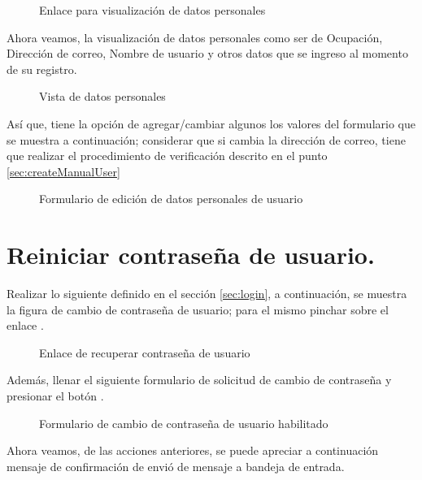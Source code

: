 \begin{figure}[!ht]
\centering
		\caption{Enlace para visualización de datos personales}
\end{figure}

Ahora veamos, la visualización de datos personales como ser de Ocupación,
Dirección de correo, Nombre de usuario y otros datos que se ingreso al momento
de su registro. 

\begin{figure}[H]
\centering
		\caption{Vista de datos personales}
\end{figure}

Así que, tiene la opción de agregar/cambiar algunos los valores del formulario
que se muestra a continuación; considerar que si cambia la dirección de correo,
tiene que realizar el procedimiento de verificación descrito en el punto 
\ref{sec:createManualUser}

\begin{figure}[H]
\centering
		\caption{Formulario de edición de datos personales de usuario}
\end{figure}

\section{Reiniciar contraseña de usuario.}

Realizar lo siguiente definido en el sección \ref{sec:login}, a continuación,
se muestra la figura de cambio de contraseña de usuario; para el mismo pinchar
sobre el enlace .
  
\begin{figure}[!ht]
\centering
		\caption{Enlace de recuperar contraseña de usuario}
\end{figure}

Además, llenar el siguiente formulario de solicitud de cambio de contraseña y
presionar el botón .

\begin{figure}[H]
\centering
		\caption{Formulario de cambio de contraseña de usuario habilitado}
\end{figure}

Ahora veamos, de las acciones anteriores, se puede apreciar a continuación
mensaje de confirmación de envió de mensaje a bandeja de entrada.

